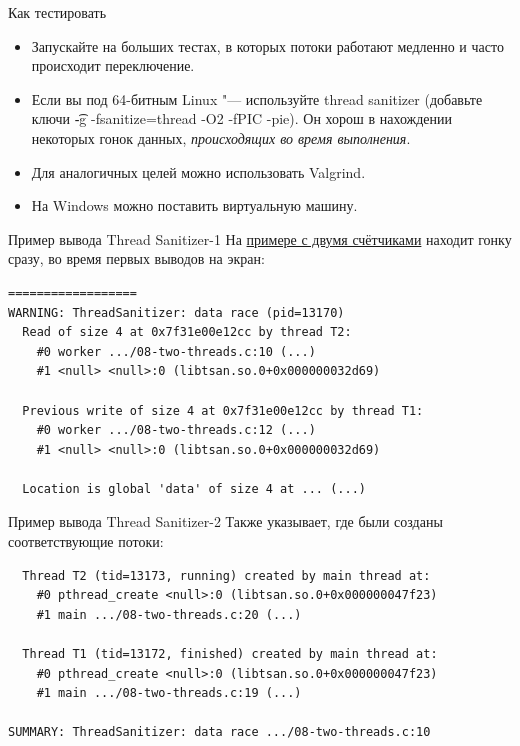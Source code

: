 \begin{frame}{Как тестировать}
	\begin{itemize}
		\item Запускайте на больших тестах, в которых потоки работают медленно и часто происходит переключение.
		\item
			Если вы под 64-битным Linux "--- используйте thread sanitizer (добавьте ключи \t{-g -fsanitize=thread -O2 -fPIC -pie}).
			Он хорош в нахождении некоторых гонок данных, \textit{происходящих во время выполнения}.
		\item
			Для аналогичных целей можно использовать Valgrind.
		\item
			На Windows можно поставить виртуальную машину.
	\end{itemize}
\end{frame}

\begin{frame}[fragile]{Пример вывода Thread Sanitizer-1}
	На \href{https://github.com/yeputons/fall-2016-paradigms/raw/master/161019/sources/08-two-threads.c}{примере с двумя счётчиками} находит гонку сразу,
	во время первых выводов на экран:
\begin{verbatim}
==================
WARNING: ThreadSanitizer: data race (pid=13170)
  Read of size 4 at 0x7f31e00e12cc by thread T2:
    #0 worker .../08-two-threads.c:10 (...)
    #1 <null> <null>:0 (libtsan.so.0+0x000000032d69)

  Previous write of size 4 at 0x7f31e00e12cc by thread T1:
    #0 worker .../08-two-threads.c:12 (...)
    #1 <null> <null>:0 (libtsan.so.0+0x000000032d69)

  Location is global 'data' of size 4 at ... (...)
\end{verbatim}
\end{frame}

\begin{frame}[fragile]{Пример вывода Thread Sanitizer-2}
	Также указывает, где были созданы соответствующие потоки:
\begin{verbatim}
  Thread T2 (tid=13173, running) created by main thread at:
    #0 pthread_create <null>:0 (libtsan.so.0+0x000000047f23)
    #1 main .../08-two-threads.c:20 (...)

  Thread T1 (tid=13172, finished) created by main thread at:
    #0 pthread_create <null>:0 (libtsan.so.0+0x000000047f23)
    #1 main .../08-two-threads.c:19 (...)

SUMMARY: ThreadSanitizer: data race .../08-two-threads.c:10
\end{verbatim}
\end{frame}
